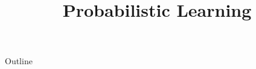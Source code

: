 
%
%





\title[Probabilistic Learning]{Probabilistic Learning}

%

\begin{frame}
  \titlepage
\end{frame}

\begin{frame}{Outline}
  \tableofcontents
\end{frame}

